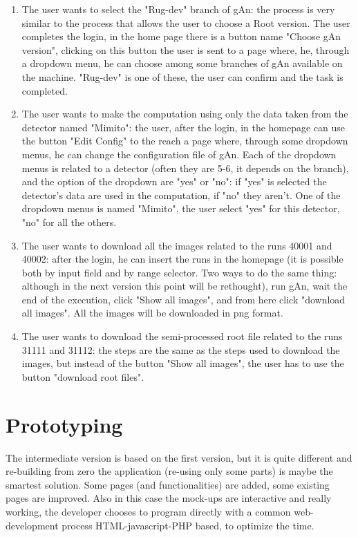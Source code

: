 \begin{enumerate}
\item The user wants to select the "Rug-dev" branch of gAn:
the process is very similar to the process that allows the user to choose a Root version. The user completes the login, in the home page there is a button name "Choose gAn version", clicking on this button the user is sent to a page where, he, through a dropdown menu, he can choose among some branches of gAn available on the machine. "Rug-dev" is one of these, the user can confirm and the task is completed.

\item The user wants to make the computation using only the data taken from the detector named "Mimito": the user, after the login, in the homepage can use the button "Edit Config" to the reach a page where, through some dropdown menus, he can change the configuration file of gAn. Each of the dropdown menus is related to a detector (often they are 5-6, it depends on the branch), and the option of the dropdown are "yes" or "no": if "yes" is selected the detector's data are used in the computation, if "no" they aren't. One of the dropdown menus is named "Mimito", the user select "yes" for this detector, "no" for all the others.  

\item The user wants to download all the images related to the runs 40001 and 40002:
after the login, he can insert the runs in the homepage (it is possible both by input field and by range selector. Two ways to do the same thing: although in the next version this point will be rethought), run gAn, wait the end of the execution, click "Show all images", and from here click "download all images". All the images will be downloaded in png format.

\item The user wants to download the semi-processed root file related to the runs 31111 and 31112:
the steps are the same as the steps used to download the images, but instead of the button "Show all images", the user has to use the button "download root files".     

\end{enumerate}  


\section{Prototyping}

The intermediate version is based on the first version, but it is quite different and re-building from zero the application (re-using only some parts) is maybe the smartest solution. Some pages (and functionalities) are added, some existing pages are improved. 
Also in this case the mock-ups are interactive and really working, the developer chooses to program directly with a common web-development process HTML-javascript-PHP based, to optimize the time.


